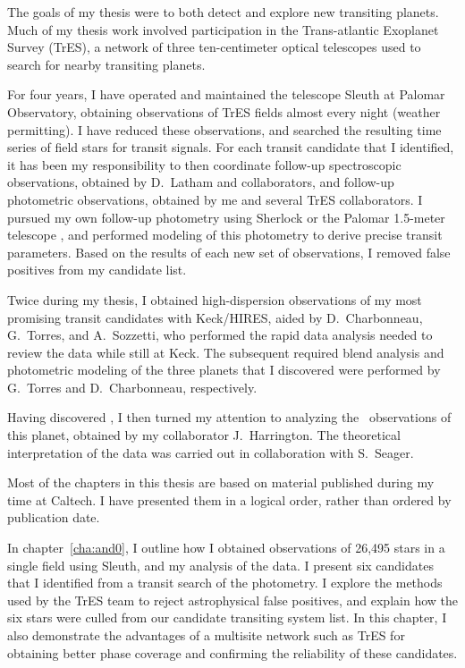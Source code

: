 The goals of my thesis were to both detect and explore new transiting planets.
Much of my thesis work involved participation in the Trans-atlantic Exoplanet Survey (TrES), a network of three ten-centimeter optical telescopes used to search for nearby transiting planets.

For four years, I have operated and maintained the telescope Sleuth at Palomar Observatory, obtaining observations of TrES fields almost every night (weather permitting).
I have reduced these observations, and searched the resulting time series of field stars for transit signals.
For each transit candidate that I identified, it has been my responsibility to then coordinate follow-up spectroscopic observations, obtained by D.~Latham and collaborators, and follow-up photometric observations, obtained by me and several TrES collaborators.
I pursued my own follow-up photometry using Sherlock \citep{Kotredes_Charbonneau_Looper:2004a} or the Palomar 1.5-meter telescope \citep[see, e.g.,][for an example of the 1.5-meter photometry]{Holman_Winn_Latham:apj:2006a}, and performed modeling of this photometry to derive precise transit parameters.
Based on the results of each new set of observations, I removed false positives from my candidate list.

Twice during my thesis, I obtained high-dispersion observations of my most promising transit candidates with Keck/HIRES, aided by D.~Charbonneau, G.~Torres, and A.~Sozzetti, who performed the rapid data analysis needed to review the data while still at Keck.
The subsequent required blend analysis and photometric modeling of the three planets that I discovered were performed by G.~Torres and D.~Charbonneau, respectively.

Having discovered \tresTwo, I then turned my attention to analyzing the \spi\ observations of this planet, obtained by my collaborator J.~Harrington.
The theoretical interpretation of the data was carried out in collaboration with S.~Seager.

Most of the chapters in this thesis are based on material published during my time at Caltech.
I have presented them in a logical order, rather than ordered by publication date.

In chapter~\ref{cha:and0}, I outline how I obtained observations of 26,495 stars in a single field using Sleuth, and my analysis of the data.
I present six candidates that I identified from a transit search of the photometry.
I explore the methods used by the TrES team to reject astrophysical false positives, and explain how the six stars were culled from our candidate transiting system list.
In this chapter, I also demonstrate the advantages of a multisite network such as TrES for obtaining better phase coverage and confirming the reliability of these candidates.

